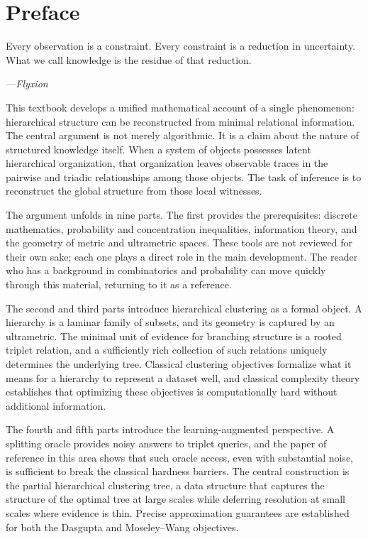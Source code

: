 \chapter*{Preface}

\epigraph{%
  Every observation is a constraint.
  Every constraint is a reduction in uncertainty.
  What we call knowledge is the residue of that reduction.%
}{\textit{---Flyxion}}

This textbook develops a unified mathematical account of a single phenomenon: hierarchical structure can be reconstructed from minimal relational information. The central argument is not merely algorithmic. It is a claim about the nature of structured knowledge itself. When a system of objects possesses latent hierarchical organization, that organization leaves observable traces in the pairwise and triadic relationships among those objects. The task of inference is to reconstruct the global structure from those local witnesses.

The argument unfolds in nine parts. The first provides the prerequisites: discrete mathematics, probability and concentration inequalities, information theory, and the geometry of metric and ultrametric spaces. These tools are not reviewed for their own sake; each one plays a direct role in the main development. The reader who has a background in combinatorics and probability can move quickly through this material, returning to it as a reference.

The second and third parts introduce hierarchical clustering as a formal object. A hierarchy is a laminar family of subsets, and its geometry is captured by an ultrametric. The minimal unit of evidence for branching structure is a rooted triplet relation, and a sufficiently rich collection of such relations uniquely determines the underlying tree. Classical clustering objectives formalize what it means for a hierarchy to represent a dataset well, and classical complexity theory establishes that optimizing these objectives is computationally hard without additional information.

The fourth and fifth parts introduce the learning-augmented perspective. A splitting oracle provides noisy answers to triplet queries, and the paper of reference in this area shows that such oracle access, even with substantial noise, is sufficient to break the classical hardness barriers. The central construction is the partial hierarchical clustering tree, a data structure that captures the structure of the optimal tree at large scales while deferring resolution at small scales where evidence is thin. Precise approximation guarantees are established for both the Dasgupta and Moseley--Wang objectives.

